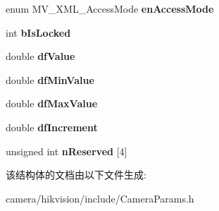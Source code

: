 \begin{DoxyCompactItemize}
\mbox{\label{struct___m_v___x_m_l___f_e_a_t_u_r_e___float___a3d4d9f7a1c76fe7240d543082534aad5}} 
enum M\+V\+\_\+\+X\+M\+L\+\_\+\+Access\+Mode {\bfseries en\+Access\+Mode}
\item 
\mbox{\label{struct___m_v___x_m_l___f_e_a_t_u_r_e___float___ab4d498ad216e1945587d6cd09d52da88}} 
int {\bfseries b\+Is\+Locked}
\item 
\mbox{\label{struct___m_v___x_m_l___f_e_a_t_u_r_e___float___ad075a5517b4dd9f1b637a87fedccd443}} 
double {\bfseries df\+Value}
\item 
\mbox{\label{struct___m_v___x_m_l___f_e_a_t_u_r_e___float___a780deed8fe406f498b214a39e5b9d04a}} 
double {\bfseries df\+Min\+Value}
\item 
\mbox{\label{struct___m_v___x_m_l___f_e_a_t_u_r_e___float___a08d7aa773c86ba4d226daf300006dc8b}} 
double {\bfseries df\+Max\+Value}
\item 
\mbox{\label{struct___m_v___x_m_l___f_e_a_t_u_r_e___float___a737982c081d9e4266fee5bf1bd62913e}} 
double {\bfseries df\+Increment}
\item 
\mbox{\label{struct___m_v___x_m_l___f_e_a_t_u_r_e___float___a6bb4568b34ae070ebbfedfdeac0fe51f}} 
unsigned int {\bfseries n\+Reserved} \mbox{[}4\mbox{]}
\end{DoxyCompactItemize}


该结构体的文档由以下文件生成\+:\begin{DoxyCompactItemize}
\item 
camera/hikvision/include/Camera\+Params.\+h\end{DoxyCompactItemize}
